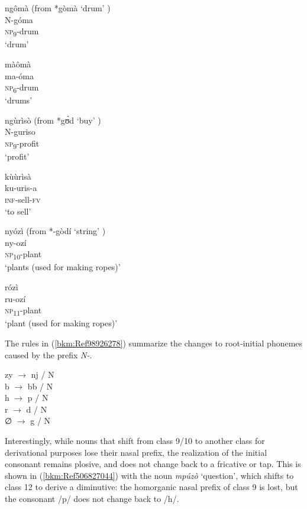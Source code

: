 \ea
\label{bkm:Ref98926175}
\ea
ngômà (from *gòmà ‘drum’ \citep{BastinEtAl2002})\\
N-góma\\
\textsc{np}\textsubscript{9}-drum\\
\glt ‘drum’

\ex
màômà\\
ma-óma\\
\textsc{np}\textsubscript{6}-drum\\
\glt ‘drums’

\z\z

\ea
\label{bkm:Ref98926178}
\ea
ngùrìsò (from *g\`{ʊ}d ‘buy’ \citep{BastinEtAl2002})\\
N-guriso      \\
\textsc{np}\textsubscript{9}-profit\\  
\glt ‘profit’      

\ex
kùùrìsà\\
ku-uris-a\\
\textsc{inf}-sell-\textsc{fv}\\
\glt ‘to sell’

\z\z

\ea
\label{bkm:Ref98926206}
\ea
nyózì (from *-gòdí ‘string’ \citep{BastinEtAl2002})\\
ny-ozí\\
\textsc{np}\textsubscript{10}-plant \\
\glt ‘plants (used for making ropes)’

\ex
rózì\\
ru-ozí\\
\textsc{np}\textsubscript{11}-plant \\
\glt ‘plant (used for making ropes)’
  
\z\z

The rules in (\ref{bkm:Ref98926278}) summarize the changes to root-initial phonemes caused by the prefix \textit{N-}.

\ea
\label{bkm:Ref98926278}
  zy $\to$ nj / N{\longrule}\\
  b $\to$ bb / N{\longrule}\\
  h $\to$ p / N{\longrule}\\
  r $\to$ d / N{\longrule}\\
  ∅ $\to$ g / N{\longrule}
\z

Interestingly, while nouns that shift from class 9/10 to another class for derivational purposes lose their nasal prefix, the realization of the initial conso\-nant remains plosive, and does not change back to a fricative or tap. This is shown in (\ref{bkm:Ref506827044}) with the noun \textit{mpúzò} ‘ques\-tion’, which shifts to class 12 to derive a diminutive: the homorganic nasal prefix of class 9 is lost, but the consonant /p/ does not change back to /h/.

